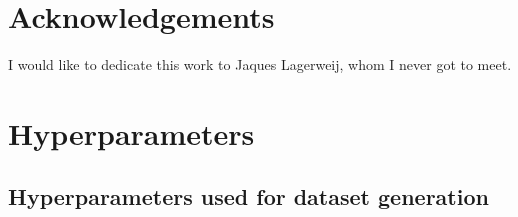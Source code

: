 \documentclass{article}
\begin{document}

\section{Acknowledgements} %

I would like to dedicate this work to Jaques Lagerweij,
whom I never got to meet.

\pagebreak

\nocite{*}
% 


\pagebreak

\appendix

\section{Hyperparameters} \label{sec:hpar}

\subsection{Hyperparameters used for dataset generation}
\end{document}
